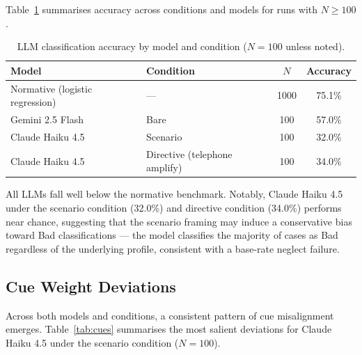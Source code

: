\documentclass[midterm]{sparreport}
\begin{document}
Table~\ref{tab:accuracy} summarises accuracy across conditions and models for runs with $N \geq 100$.

\begin{table}[htbp]
  \centering
  \caption{LLM classification accuracy by model and condition ($N = 100$ unless noted).}
  \label{tab:accuracy}
  \begin{tabular}{llcc}
    \toprule
    Model & Condition & $N$ & Accuracy \\
    \midrule
    Normative (logistic regression) & --- & 1000 & 75.1\% \\
    Gemini 2.5 Flash & Bare & 100 & 57.0\% \\
    Claude Haiku 4.5 & Scenario & 100 & 32.0\% \\
    Claude Haiku 4.5 & Directive (telephone amplify) & 100 & 34.0\% \\
    \bottomrule
  \end{tabular}
\end{table}

All LLMs fall well below the normative benchmark. Notably, Claude Haiku 4.5 under the scenario condition (32.0\%) and directive condition (34.0\%) performs near chance, suggesting that the scenario framing may induce a conservative bias toward Bad classifications — the model classifies the majority of cases as Bad regardless of the underlying profile, consistent with a base-rate neglect failure.

\subsection{Cue Weight Deviations}

Across both models and conditions, a consistent pattern of cue misalignment emerges. Table~\ref{tab:cues} summarises the most salient deviations for Claude Haiku 4.5 under the scenario condition ($N = 100$).
\end{document}
